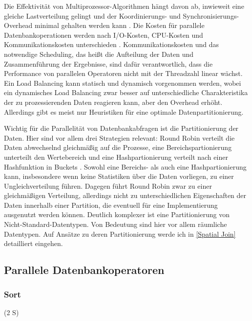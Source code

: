 \documentclass[a4paper,12pt,twoside]{article}
\begin{document}
Die Effektivität von Multiprozessor-Algorithmen hängt davon ab, inwieweit eine gleiche Lastverteilung gelingt und der Koordinierungs- und Synchronisierungs-Overhead minimal gehalten werden kann \parencite{Lakshmi1990}. Die Kosten für parallele Datenbankoperationen werden nach I/O-Kosten, CPU-Kosten und Kommunikationskosten unterschieden \parencite [S. 23]{Yu1998}. Kommunikationskosten und das notwendige Scheduling, das heißt die Aufteilung der Daten und Zusammenführung der Ergebnisse, sind dafür verantwortlich, dass die Performance von parallelen Operatoren nicht mit der Threadzahl linear wächst. Ein Load Balancing kann statisch und dynamisch vorgenommen werden, wobei ein dynamisches Load Balancing zwar besser auf unterschiedliche Charakteristika der zu prozessierenden Daten reagieren kann, aber den Overhead erhöht. Allerdings gibt es meist nur Heuristiken für eine optimale Datenpartitionierung.

Wichtig für die Parallelität von Datenbankabfragen ist die Partitionierung der Daten. Hier sind vor allem drei Strategien relevant: Round Robin verteilt die Daten abwechselnd gleichmäßig auf die Prozesse, eine Bereichspartionierung unterteilt den Wertebereich und eine Hashpartionierung verteilt nach einer Hashfunktion in Buckets \parencite{Yu1998}. Sowohl eine Bereichs- als auch eine Hashpartionierung kann, insbesondere wenn keine Statistiken über die Daten vorliegen, zu einer Ungleichverteilung führen. Dagegen führt Round Robin zwar zu einer gleichmäßigen Verteilung, allerdings nicht zu unterschiedlichen Eigenschaften der Daten innerhalb einer Partition, die eventuell für eine Implementierung ausgenutzt werden können. Deutlich komplexer ist eine Partitionierung von Nicht-Standard-Datentypen. Von Bedeutung sind hier vor allem räumliche Datentypen. Auf Ansätze zu deren Partitionierung werde ich in \autoref{Spatial Join} detailliert eingehen. 


\subsection{Parallele Datenbankoperatoren}

\subsubsection{Sort} (2 S)
\label{Sort} 
\end{document}
